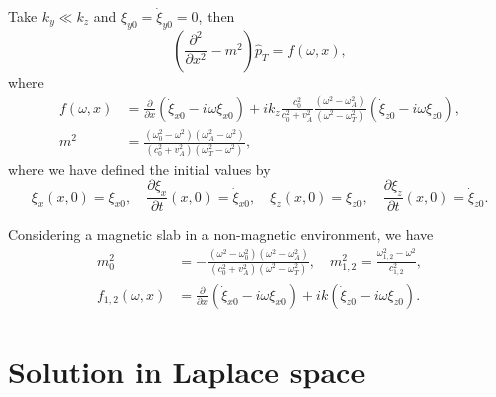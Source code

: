 \documentclass[12pt]{article}
\begin{document}
Take $k_y \ll k_z$ and $\xi_{y0} = \dot{\xi}_{y0} = 0$, then
\begin{equation}
\left( \frac{\partial^2}{\partial x^2} - m^2 \right) \hat{p}_T = f(\omega, x),
\end{equation}
where
\begin{align}
f(\omega, x) &= \frac{\partial}{\partial x} (\dot{\xi}_{x0} - i\omega\xi_{x0}) + ik_z \frac{c_0^2}{c_0^2 + v_A^2} \frac{(\omega^2 - \omega_A^2)}{(\omega^2 - \omega_T^2)} (\dot{\xi}_{z0} - i\omega\xi_{z0}), \\
m^2 &= \frac{(\omega_0^2 - \omega^2)(\omega_A^2 - \omega^2)}{(c_0^2 + v_A^2)(\omega_T^2 - \omega^2)},
\end{align}
where we have defined the initial values by
\begin{equation}
\xi_x(x, 0) = \xi_{x0}, \quad \frac{\partial{}\xi_x}{\partial{t}}(x, 0) = \dot{\xi}_{x0}, \quad \xi_z(x, 0) = \xi_{z0}, \quad \frac{\partial{}\xi_z}{\partial{t}}(x, 0) = \dot{\xi}_{z0}.
\end{equation}

Considering a magnetic slab in a non-magnetic environment, we have
\begin{align}
m_0^2 &= - \frac{(\omega^2 - \omega_0^2)(\omega^2 - \omega_A^2)}{(c_0^2 + v_A^2)(\omega^2 - \omega_T^2)}, \quad m_{1,2}^2 = \frac{\omega_{1,2}^2 - \omega^2}{c_{1,2}^2}, \\
f_{1,2}(\omega,x) &= \frac{\partial}{\partial x} (\dot{\xi}_{x0} - i\omega\xi_{x0}) + ik(\dot{\xi}_{z0} - i\omega\xi_{z0}).
\end{align}


\section{Solution in Laplace space}
\end{document}
